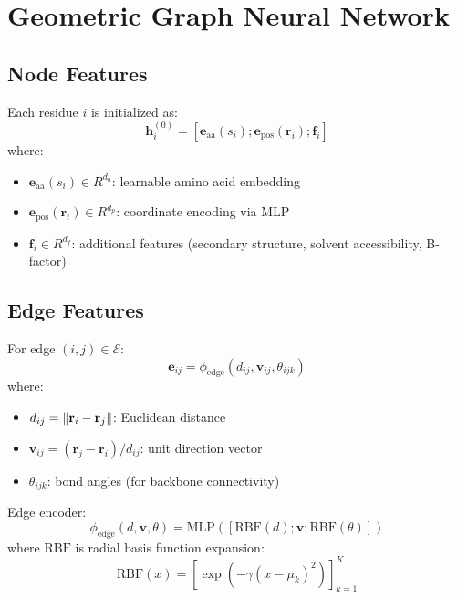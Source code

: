 \documentclass[11pt]{article}
\DeclarePairedDelimiter{\norm}{\lVert}{\rVert}
\begin{document}

\section{Geometric Graph Neural Network}

\subsection{Node Features}

Each residue $i$ is initialized as:
\begin{equation}
    \mathbf{h}_i^{(0)} = [\mathbf{e}_{\text{aa}}(s_i); \mathbf{e}_{\text{pos}}(\mathbf{r}_i); \mathbf{f}_i]
\end{equation}
where:
\begin{itemize}
    \item $\mathbf{e}_{\text{aa}}(s_i) \in R^{d_a}$: learnable amino acid embedding
    \item $\mathbf{e}_{\text{pos}}(\mathbf{r}_i) \in R^{d_p}$: coordinate encoding via MLP
    \item $\mathbf{f}_i \in R^{d_f}$: additional features (secondary structure, solvent accessibility, B-factor)
\end{itemize}

\subsection{Edge Features}

For edge $(i,j) \in \mathcal{E}$:
\begin{equation}
    \mathbf{e}_{ij} = \phi_{\text{edge}}(d_{ij}, \mathbf{v}_{ij}, \theta_{ijk})
\end{equation}
where:
\begin{itemize}
    \item $d_{ij} = \norm{\mathbf{r}_i - \mathbf{r}_j}$: Euclidean distance
    \item $\mathbf{v}_{ij} = (\mathbf{r}_j - \mathbf{r}_i)/d_{ij}$: unit direction vector
    \item $\theta_{ijk}$: bond angles (for backbone connectivity)
\end{itemize}

Edge encoder:
\begin{equation}
    \phi_{\text{edge}}(d, \mathbf{v}, \theta) = \text{MLP}([\text{RBF}(d); \mathbf{v}; \text{RBF}(\theta)])
\end{equation}
where $\text{RBF}$ is radial basis function expansion:
\begin{equation}
    \text{RBF}(x) = [\exp(-\gamma (x - \mu_k)^2)]_{k=1}^K
\end{equation}
\end{document}
